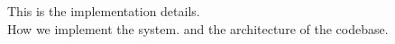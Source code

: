 This is the implementation details. \\

How we implement the system. and the architecture of the codebase.